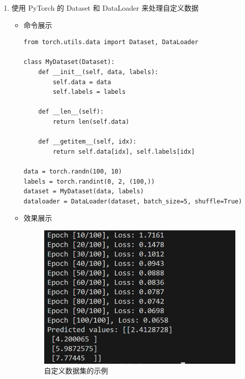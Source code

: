 \documentclass[UTF8]{ctexart}
\begin{document}
\begin{enumerate}
  \item 使用 PyTorch 的 Dataset 和 DataLoader 来处理自定义数据
  \begin{itemize}
  \item 命令展示
  \begin{verbatim}
from torch.utils.data import Dataset, DataLoader

class MyDataset(Dataset):
    def __init__(self, data, labels):
        self.data = data
        self.labels = labels

    def __len__(self):
        return len(self.data)

    def __getitem__(self, idx):
        return self.data[idx], self.labels[idx]

data = torch.randn(100, 10)
labels = torch.randint(0, 2, (100,))
dataset = MyDataset(data, labels)
dataloader = DataLoader(dataset, batch_size=5, shuffle=True)
  \end{verbatim}
  
  \item 效果展示
  \begin{figure}[H]
    \centering
    \includegraphics[width=\textwidth]{34} %
    \caption{自定义数据集的示例} %
  \end{figure}
  \end{itemize}
\end{enumerate}
\end{document}
